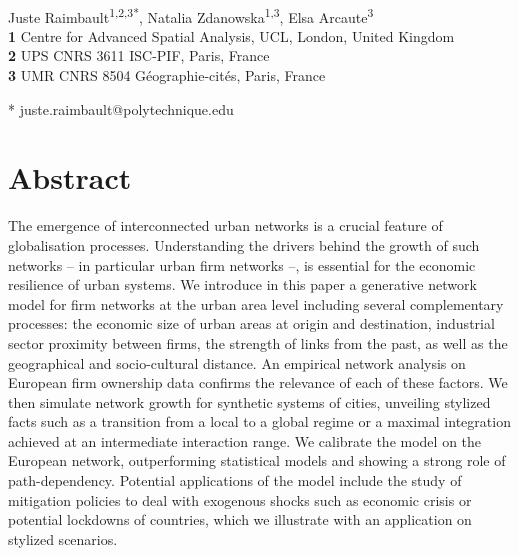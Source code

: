 \documentclass[10pt,letterpaper]{article}
\begin{document}
\justify
\vspace*{0.2in}

\begin{flushleft}
{\Large
\textbf{} %
}
\newline
\\
Juste Raimbault\textsuperscript{1,2,3*},
Natalia Zdanowska\textsuperscript{1,3},
Elsa Arcaute\textsuperscript{3}
\\
\bigskip
\textbf{1} Centre for Advanced Spatial Analysis, UCL, London, United Kingdom
\\
\textbf{2} UPS CNRS 3611 ISC-PIF, Paris, France
\\
\textbf{3} UMR CNRS 8504 G{\'e}ographie-cit{\'e}s, Paris, France
\\
\bigskip

* juste.raimbault@polytechnique.edu

\end{flushleft}


\section*{Abstract}
The emergence of interconnected urban networks is a crucial feature of globalisation processes. Understanding the drivers behind the growth of such networks -- in particular urban firm networks --, is essential for the economic resilience of urban systems. We introduce in this paper a generative network model for firm networks at the urban area level including several complementary processes: the economic size of urban areas at origin and destination, industrial sector proximity between firms, the strength of links from the past, as well as the geographical and socio-cultural distance. An empirical network analysis on European firm ownership data confirms the relevance of each of these factors. We then simulate network growth for synthetic systems of cities, unveiling stylized facts such as a transition from a local to a global regime or a maximal integration achieved at an intermediate interaction range. We calibrate the model on the European network, outperforming statistical models and showing a strong role of path-dependency. Potential applications of the model include the study of mitigation policies to deal with exogenous shocks such as economic crisis or potential lockdowns of countries, which we illustrate with an application on stylized scenarios.
\end{document}
